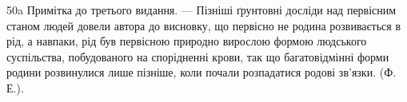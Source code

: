 50a Примітка до третього видання. — Пізніші ґрунтовні досліди
над первісним станом людей довели автора до висновку, що первісно не
родина розвивається в рід, а навпаки, рід був первісною природно
вирослою формою людського суспільства, побудованого на спорідненні
крови, так що багатовідмінні форми родини розвинулися лише пізніше,
коли почали розпадатися родові зв'язки. (Ф. Е.).
\parbreak{}  %
